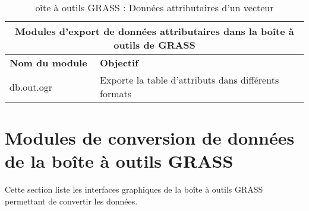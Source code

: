 \begin{table}[H]
\centering
 \begin{tabular}{|p{4cm}|p{10cm}|}
  \hline \multicolumn{2}{|c|}{\textbf{Modules d'export de données attributaires dans la boîte à outils de GRASS}} \\
  \hline \textbf{Nom du module} & \textbf{Objectif} \\
  \hline db.out.ogr & Exporte la table d'attributs dans différents formats  \\
\hline
\end{tabular}
\caption{oîte à outils GRASS : Données attributaires d'un vecteur}
\end{table}

\newpage

\section{Modules de conversion de données de la boîte à outils GRASS}

Cette section liste les interfaces graphiques de la boîte à outils GRASS permettant de convertir les données.

